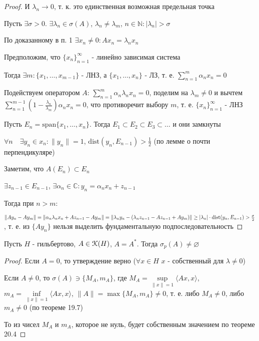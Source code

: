 \documentclass[a4paper,12pt]{report}
\newcommand*{\hm}[1]{#1\nobreak\discretionary{}%
            {\hbox{$\mathsurround=0pt #1$}}{}}
\begin{document}
\begin{proof}
И $\lambda_n\to0$, т. к. это единственная возможная предельная точка

Пусть $\exists\sigma>0$. $\exists\lambda_n\in\sigma(A)$, $\lambda_n\ne\lambda_m$, $n\in\mathbb N\colon|\lambda_n|>\sigma$

По доказанному в п. 1 $\exists x_n\ne0\colon Ax_n=\lambda_n x_n$

Предположим, что $\{x_n\}_{n=1}^\infty$ - линейно зависимая система

Тогда $\exists m\colon\{x_1,\ldots,x_{m-1}\}$ - ЛНЗ, а $\{x_1,\ldots,x_n\}$ - ЛЗ, т. е. $\sum\limits_{n=1}^m\alpha_n x_n=0$

Подействуем оператором $A$: $\sum\limits_{n=1}^m \alpha_n\lambda_n x_n=0$, поделим на $\lambda_m\ne0$ и вычтем $\sum\limits_{n=1}^{m-1}\left(1-\displaystyle\frac{\lambda_n}{\lambda_m}\right)\alpha_n x_n=0$, что противоречит выбору $m$, т. е. $\{x_n\}_{n=1}^\infty$ - ЛНЗ

Пусть $E_n=\mathrm{span}\{x_1,\ldots,x_n\}$. Тогда $E_1\subset E_2\subset E_3\subset\ldots$ и они замкнуты

$\forall n\quad\exists y_n\in x_n\colon\|y_n\|=1$, $\mathrm{dist}(y_n,E_{n-1})>\frac12$ (по лемме о почти перпендикуляре)

Заметим, что $A(E_n)\subset E_n$

$\exists z_{n-1}\in E_{n-1}$, $\exists\alpha_n\in\mathbb C\colon y_n=\alpha_n x_n+z_{n-1}$

Тогда при $n>m$:

$\|Ay_n-Ay_m\|=\|\alpha_n\lambda_n x_n+Az_{n-1}-Ay_m\|=\|\lambda_n y_n-(\lambda_n z_{n-1}-Az_{n-1}\hm+Ay_m)\|\ge|\lambda_n|\cdot\mathrm{dist}(y_n,E_{n-1})>\frac{\sigma}2$, т. е. из $\{Ay_n\}$ нельзя выделить фундаментальную подпоследовательность
\end{proof}
 


\begin{lem}
Пусть $H$ - гильбертово, $A\in\EuScript K(H)$, $A=A^*$. Тогда $\sigma_p(A)\ne\varnothing$
\end{lem}
\begin{proof}
Если $A=0$, то утверждение верно ($\forall x\in H$ $x$ - собственный для $\lambda\ne0$)

Если $A\ne0$, то $\sigma(A)\ni\{M_A,m_A\}$, где $M_A=\sup\limits_{\|x\|=1}\langle Ax,x\rangle$, $m_A=\inf\limits_{\|x\|=1}\langle Ax,x\rangle$, $\|A\|=\max\{M_A,m_A\}\ne0$, т. е. либо $M_A\ne0$, либо $m_A\ne0$ (по теореме 19.7)

То из чисел $M_A$ и $m_A$, которое не нуль, будет собственным значением по теореме 20.4
\end{proof}
 
\end{document}
